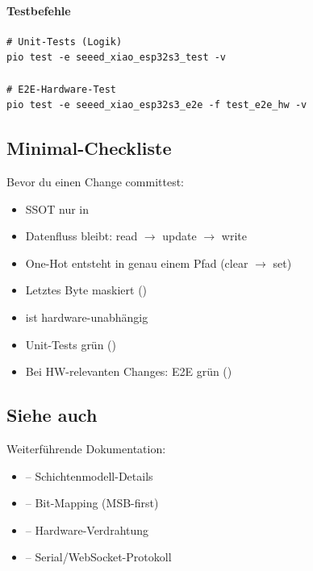 \paragraph{Testbefehle}

\begin{lstlisting}[style=shell,caption={Testbefehle für Unit- und E2E-Tests},label={lst:testbefehle}]
# Unit-Tests (Logik)
pio test -e seeed_xiao_esp32s3_test -v

# E2E-Hardware-Test
pio test -e seeed_xiao_esp32s3_e2e -f test_e2e_hw -v
\end{lstlisting}

\subsection{Minimal-Checkliste}
\label{subsec:checkliste}

Bevor du einen Change committest:

\begin{itemize}
  \item[$\square$] SSOT nur in 
  \item[$\square$] Datenfluss bleibt: read $\to$ update $\to$ write
  \item[$\square$] One-Hot entsteht in genau einem Pfad (clear $\to$ set)
  \item[$\square$] Letztes Byte maskiert ()
  \item[$\square$]  ist hardware-unabhängig
  \item[$\square$] Unit-Tests grün ()
  \item[$\square$] Bei HW-relevanten Changes: E2E grün ()
\end{itemize}

\subsection{Siehe auch}
\label{subsec:arch-siehe-auch}

Weiterführende Dokumentation:

\begin{itemize}
  \item {} -- Schichtenmodell-Details
  \item {} -- Bit-Mapping (MSB-first)
  \item {} -- Hardware-Verdrahtung
  \item {} -- Serial/WebSocket-Protokoll
\end{itemize}
